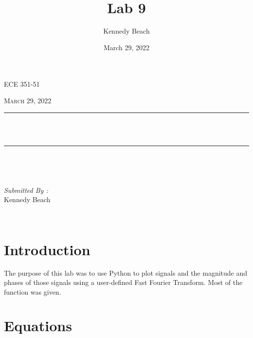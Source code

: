 \documentclass[12pt]{report}
\title{Lab 9}
\author{Kennedy Beach}
\date{March 29, 2022}
\makeatletter
\let\thetitle\@title
\makeatother
\begin{document}
\begin{titlepage}
\centering
\vspace*{0.5 cm}
\begin{center}    \textsc{\Large   ECE 351-51 }\\[2.0 cm]
\end{center}%
\textsc{\Large March 29, 2022}\\[0.5 cm] %
\rule{\linewidth}{0.2 mm} \\[0.4 cm]
{ \huge \bfseries \thetitle}\\
\rule{\linewidth}{0.2 mm} \\[1.5 cm]
\begin{minipage}{0.4\textwidth}
\begin{flushleft} \large
\end{flushleft}
\end{minipage}~
\begin{minipage}{0.4\textwidth}
\begin{flushright} \large
\emph{Submitted By :} \\
Kennedy Beach
\end{flushright}
\end{minipage}\\[2 cm]
\end{titlepage}
\tableofcontents
\pagebreak
\renewcommand{\thesection}{\arabic{section}}
\section{Introduction}
The purpose of this lab was to use Python to plot signals and the magnitude and phases of those signals using a user-defined Fast Fourier Transform. Most of the function was given.
\section{Equations}
\end{document}
